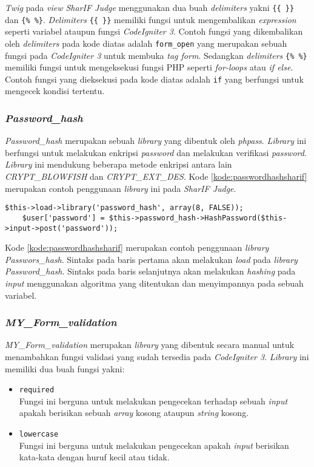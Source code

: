 \textit{Twig} pada \textit{view SharIF Judge} menggunakan dua buah \textit{delimiters} yakni \verb|{{ }}| dan \verb|{% %}|. \textit{Delimiters} \verb|{{ }}| memiliki fungsi untuk mengembalikan \textit{expression} seperti variabel ataupun fungsi \textit{CodeIgniter 3}. Contoh fungsi yang dikembalikan oleh \textit{delimiters} pada kode diatas adalah \texttt{form\_open} yang merupakan sebuah fungsi pada \textit{CodeIgniter 3} untuk membuka \textit{tag form}. Sedangkan \textit{delimiters} \verb|{% %}| memiliki fungsi untuk mengeksekusi fungsi PHP seperti \textit{for-loops} atau \textit{if else}. Contoh fungsi yang dieksekusi pada kode diatas adalah \texttt{if} yang berfungsi untuk mengecek kondisi tertentu.

\subsubsection{\textit{Password\_hash}}
\textit{Password\_hash} merupakan sebuah \textit{library} yang dibentuk oleh \textit{phpass}. \textit{Library} ini berfungsi untuk melakukan enkripsi \textit{password} dan melakukan verifikasi \textit{password}. \textit{Library} ini mendukung beberapa metode enkripsi antara lain \textit{CRYPT\_BLOWFISH} dan \textit{CRYPT\_EXT\_DES}. Kode \ref{kode:passwordhashsharif} merupakan contoh penggunaan \textit{library} ini pada \textit{SharIF Judge}.

\begin{lstlisting}[caption=Contoh kode penggunaan \textit{Library Password\_hash}, label=kode:passwordhashsharif]
	$this->load->library('password_hash', array(8, FALSE));
	$user['password'] = $this->password_hash->HashPassword($this->input->post('password'));
\end{lstlisting}

Kode \ref{kode:passwordhashsharif} merupakan contoh penggunaan \textit{library Passwors\_hash}. Sintaks pada baris pertama akan melakukan \textit{load} pada \textit{library Password\_hash}. Sintaks pada baris selanjutnya akan melakukan \textit{hashing} pada \textit{input} menggunakan algoritma yang ditentukan dan menyimpannya pada sebuah variabel.

\subsubsection{\textit{MY\_Form\_validation}}
\textit{MY\_Form\_validation} merupakan \textit{library} yang dibentuk secara manual untuk menambahkan fungsi validasi yang sudah tersedia pada \textit{CodeIgniter 3}. \textit{Library} ini memiliki dua buah fungsi yakni:
\begin{itemize}
	\item \texttt{required}\\ Fungsi ini berguna untuk melakukan pengecekan terhadap sebuah \textit{input} apakah berisikan sebuah \textit{array} kosong ataupun \textit{string} kosong.
	\item \texttt{lowercase} \\ Fungsi ini berguna untuk melakukan pengecekan apakah \textit{input} berisikan kata-kata dengan huruf kecil atau tidak.
\end{itemize}

